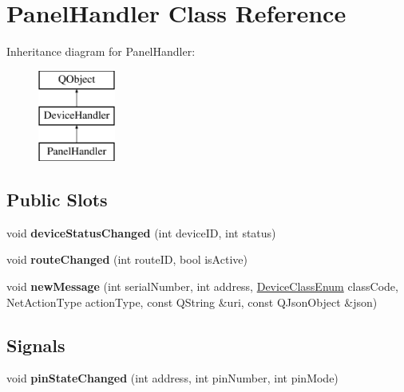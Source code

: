 \hypertarget{class_panel_handler}{}\section{Panel\+Handler Class Reference}
\label{class_panel_handler}
Inheritance diagram for Panel\+Handler\+:\begin{figure}[H]
\begin{center}
\leavevmode
\includegraphics[height=3.000000cm]{class_panel_handler}
\end{center}
\end{figure}
\subsection*{Public Slots}
\begin{DoxyCompactItemize}
\item 
\mbox{\label{class_panel_handler_a05157ddbd8078dbbfeb3322d5771a904}} 
void {\bfseries device\+Status\+Changed} (int device\+ID, int status)
\item 
\mbox{\label{class_panel_handler_a1c0aac4488ad7349d878c9da7019d0ee}} 
void {\bfseries route\+Changed} (int route\+ID, bool is\+Active)
\item 
\mbox{\label{class_panel_handler_a630c3319157392b51cf1b8723236d6a4}} 
void {\bfseries new\+Message} (int serial\+Number, int address, \hyperlink{_global_defs_8h_ad17679fac69973be9b3a2787a60d7722}{Device\+Class\+Enum} class\+Code, Net\+Action\+Type action\+Type, const Q\+String \&uri, const Q\+Json\+Object \&json)
\end{DoxyCompactItemize}
\subsection*{Signals}
\begin{DoxyCompactItemize}
\item 
\mbox{\label{class_panel_handler_a18fde358d19fa0b07f8ce084e5556031}} 
void {\bfseries pin\+State\+Changed} (int address, int pin\+Number, int pin\+Mode)
\end{DoxyCompactItemize}
